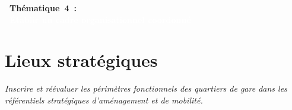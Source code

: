 \documentclass[../main.tex]{subfiles}
\begin{document}
    \newpage

    \vspace{15pt}
    \noindent
    \Large
\textbf{\textcolor{UGEblue}{~Thématique~4~:}}
    \\
\colorbox{UGEblue}{\textbf{\textcolor{white}{~Établir un cadre organisationnel coordonné~}}}
    \vspace{15pt}

    \vspace{15pt}
\section{Lieux stratégiques}

\begin{block}[Intégrer]
    \linespread{0.9}\selectfont %
    \textit{\small{Inscrire et réévaluer les périmètres fonctionnels des quartiers de gare dans les référentiels stratégiques d’aménagement et de mobilité.}}
\end{block}
\end{document}
